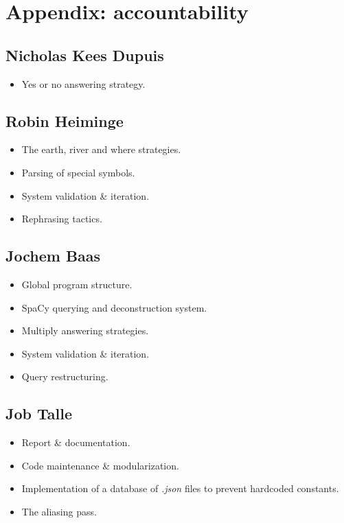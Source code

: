 \documentclass{article}
\begin{document}
\section{Appendix: accountability}
\subsection{Nicholas Kees Dupuis}
\begin{itemize}
    \item Yes or no answering strategy.
\end{itemize}

\subsection{Robin Heiminge}
\begin{itemize}
    \item The earth, river and where strategies.
    \item Parsing of special symbols.
    \item System validation \& iteration.
    \item Rephrasing tactics.
\end{itemize}

\subsection{Jochem Baas}
\begin{itemize}
    \item Global program structure.
    \item SpaCy querying and deconstruction system.
    \item Multiply answering strategies.
    \item System validation \& iteration.
    \item Query restructuring.
\end{itemize}

\subsection{Job Talle}
\begin{itemize}
    \item Report \& documentation.
    \item Code maintenance \& modularization.
    \item Implementation of a database of \emph{.json} files to prevent hardcoded constants.
    \item The aliasing pass.
\end{itemize}
\end{document}
